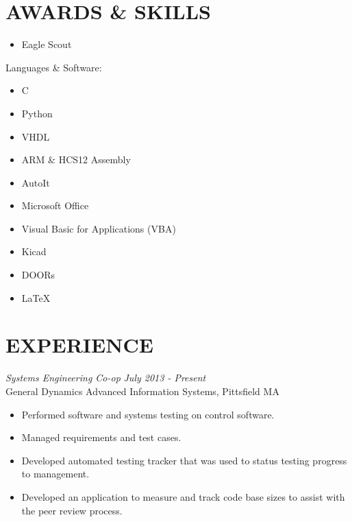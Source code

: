 \documentclass[line,margin]{res}
\begin{document}
\begin{resume}
\section{AWARDS \& SKILLS } 
		\begin{multicols}{2}
			\begin{itemize}
				\itemsep -2pt
				\item[] Eagle Scout

			\end{itemize}
		\end{multicols}
	\vspace{-10pt}
	{Languages \& Software:} %
		\begin{multicols}{2}
			\begin{itemize}
				\itemsep -2pt
				\item[] C
				\item[] Python
				\item[] VHDL
				\item[] ARM \& HCS12 Assembly
				\item[] AutoIt
				\item[] Microsoft Office
				\item[] Visual Basic for Applications (VBA)
				\item[] Kicad
				\item[] DOORs
				\item[] \LaTeX 
			\end{itemize}
		\end{multicols}
\section{EXPERIENCE} 
{\sl Systems Engineering Co-op} \hfill {\sl July 2013 - Present }\\
	General Dynamics Advanced Information Systems, Pittsfield MA
	\begin{itemize}  \itemsep -2pt %
			\item Performed software and systems testing on 
				control software. 
			\item Managed requirements and test cases.
			\item Developed automated testing tracker
				that was used to status testing progress
				to management. 
			\item Developed an application to measure and track 
				code base sizes to assist with the peer review process.
	\end{itemize}
 

\end{resume}
\end{document}
